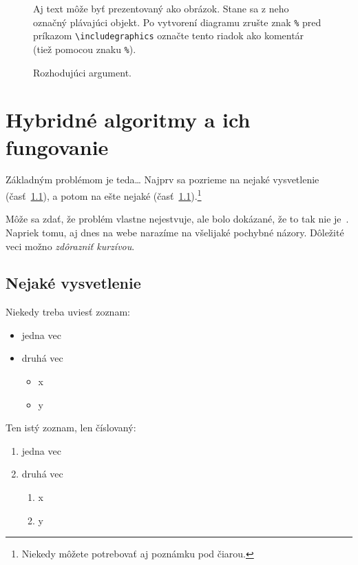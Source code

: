 \documentclass[10pt,twoside,slovak,a4paper]{article}
\begin{document}
\begin{figure*}[tbh]
\centering
Aj text môže byť prezentovaný ako obrázok. Stane sa z neho označný plávajúci objekt. Po vytvorení diagramu zrušte znak \texttt{\%} pred príkazom \verb|\includegraphics| označte tento riadok ako komentár (tiež pomocou znaku \texttt{\%}).
\caption{Rozhodujúci argument.}
\label{f:rozhod}
\end{figure*}



\section{Hybridné algoritmy a ich fungovanie} \label{ina}

Základným problémom je teda\ldots{} Najprv sa pozrieme na nejaké vysvetlenie (časť~\ref{ina:nejake}), a potom na ešte nejaké (časť~\ref{ina:nejake}).\footnote{Niekedy môžete potrebovať aj poznámku pod čiarou.}

Môže sa zdať, že problém vlastne nejestvuje\cite{Coplien:MPD}, ale bolo dokázané, že to tak nie je~\cite{Czarnecki:Staged, Czarnecki:Progress}. Napriek tomu, aj dnes na webe narazíme na všelijaké pochybné názory\cite{PLP-Framework}. Dôležité veci možno \emph{zdôrazniť kurzívou}.


\subsection{Nejaké vysvetlenie} \label{ina:nejake}

Niekedy treba uviesť zoznam:

\begin{itemize}
\item jedna vec
\item druhá vec
	\begin{itemize}
	\item x
	\item y
	\end{itemize}
\end{itemize}

Ten istý zoznam, len číslovaný:

\begin{enumerate}
\item jedna vec
\item druhá vec
	\begin{enumerate}
	\item x
	\item y
	\end{enumerate}
\end{enumerate}
\end{document}
